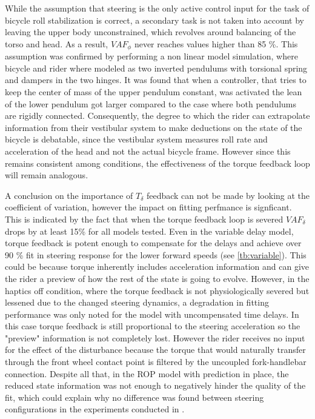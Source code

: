 While the assumption that steering is the only active control input for the task of bicycle roll stabilization is correct, a secondary task is not taken into account by leaving the upper body unconstrained, which revolves around balancing of the torso and head. As a result, \ensuremath{\mathit{VAF}_\phi} never reaches values higher than 85 \%. This assumption  was  confirmed by performing a non linear model simulation, where bicycle and rider where modeled as two inverted pendulums with torsional spring and dampers in the two hinges. It was found that when a  controller, that tries to keep the center of mass of the upper pendulum constant, was activated the lean of the lower pendulum got larger compared to the case where both pendulums are rigidly connected. Consequently, the degree to which the rider can extrapolate information from their vestibular system to make deductions on the state of the bicycle is debatable, since the vestibular system measures roll rate and acceleration of the head and not the actual bicycle frame. However since this remains consistent among conditions, the effectiveness of the torque feedback loop will remain analogous.

A conclusion on the importance of \ensuremath{T_\delta} feedback can not be made by looking at the coefficient of variation, however the impact on fitting perfmance is signficant. This is  indicated  by the fact that when the torque feedback loop is severed \ensuremath{\mathit{VAF}_\delta} drops by at least 15\% for all models tested. Even in the variable delay model, torque feedback is potent enough to compensate for the delays and achieve over 90 \% fit in steering response for the lower forward speeds (see \cref{tb:variable}). This could be because torque inherently includes acceleration information and can give  the rider a preview of how the rest of the state is going to evolve. However, in the haptics off condition, where the torque feedback is not physiologically severed but lessened due to the changed steering dynamics,  a degradation in fitting performance was only noted for the model with uncompensated time delays. In this case torque feedback is still proportional to the steering acceleration so the "preview" information is not completely lost. However the rider receives no input for the effect of the disturbance because the torque that would naturally transfer through the front wheel contact point is filtered by the uncoupled fork-handlebar connection.  Despite all that, in the ROP model with prediction in place, the reduced state information was not enough to negatively hinder the quality of the fit, which could explain why no difference was found between steering configurations in the experiments conducted in \cite{dialynaseffect}. 

